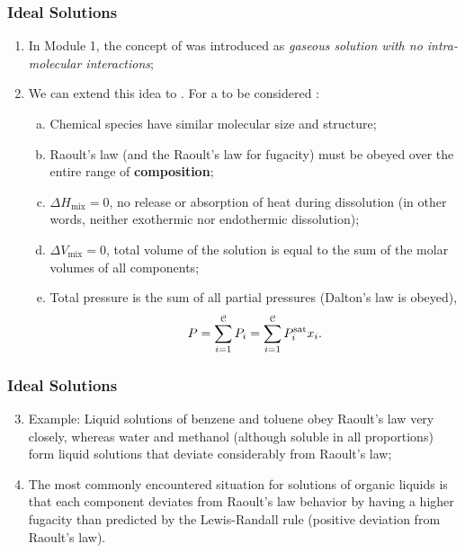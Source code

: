 \documentclass[10pt,compress,unknownkeysallowed]{beamer}
\begin{document}
\begin{frame}
  \frametitle{Ideal Solutions}
        \begin{enumerate}%
           \item<1-> In Module 1, the concept of  was introduced as {\it gaseous solution with no intra-molecular interactions};
           \item<2-> We can extend this idea to . For a   to be considered : 
             \begin{enumerate}[a)]
                \item<3-> Chemical species have similar molecular size and structure;
                \item<4-> Raoult's law (and the Raoult's law for fugacity) must be obeyed over the entire range of {\bf composition};
                \item<5-> $\Delta H_{\text{mix}}=0$, \ie no release or absorption of heat during dissolution (in other words, neither exothermic nor endothermic dissolution);
                \item<6-> $\Delta V_{\text{mix}}=0$, \ie total volume of the solution is equal to the sum of the molar volumes of all components;
                \item<7-> Total pressure is the sum of all partial pressures (\ie Dalton's law is obeyed), \ie
                  \begin{displaymath}
                    P = \summation[P_{i}]{i=1}{\mathcal{C}} = \summation[P_{i}^{\text{sat}}x_{i}]{i=1}{\mathcal{C}}.
                  \end{displaymath}
             \end{enumerate}  
        \end{enumerate}
\end{frame}
\normalsize

\begin{frame}
  \frametitle{Ideal Solutions}
        \begin{enumerate}\setcounter{enumi}{2}  
           \item<1-> Example: Liquid solutions of benzene and toluene obey Raoult's law very closely, whereas water and methanol (although soluble in all proportions) form liquid solutions that deviate considerably from Raoult's law;
           \item<2-> The most commonly encountered situation for solutions of organic liquids is that each component deviates from Raoult's law behavior by having a higher fugacity than predicted by the Lewis-Randall rule (\ie positive deviation from Raoult's law).    
        \end{enumerate}
\end{frame}
\normalsize
\end{document}
